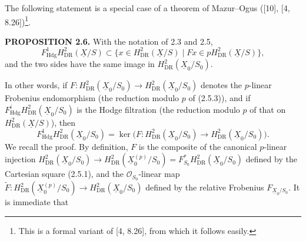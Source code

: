 \documentclass[10pt]{article}
\newcommand{\UX}{\underline{X}}
\begin{document}
The following statement is a special case of a theorem of Mazur--Ogus ([10], [4, 8.26])\footnote{This is a formal variant of [4, 8.26], from which it follows easily.}.

\noindent\textbf{PROPOSITION 2.6.} With the notation of 2.3 and 2.5,
\[
F^1_{\mathrm{Hdg}}H^2_{\mathrm{DR}}(\UX/S)
\subset\{x\in H^2_{\mathrm{DR}}(\UX/S)\mid Fx\in pH^2_{\mathrm{DR}}(\UX/S)\},
\]
and the two sides have the same image in $H^2_{\mathrm{DR}}(\UX_0/S_0)$.

In other words, if $F:H^2_{\mathrm{DR}}(\UX_0/S_0)\to H^2_{\mathrm{DR}}(\UX_0/S_0)$ denotes the $p$-linear Frobenius endomorphism (the reduction modulo $p$ of (2.5.3)), and if $F^i_{\mathrm{Hdg}}H^2_{\mathrm{DR}}(\UX_0/S_0)$ is the Hodge filtration (the reduction modulo $p$ of that on $H^2_{\mathrm{DR}}(\UX/S)$), then
\begin{equation}\tag{2.6.1}
F^1_{\mathrm{Hdg}}H^2_{\mathrm{DR}}(\UX_0/S_0)
=\ker\bigl(F:H^2_{\mathrm{DR}}(\UX_0/S_0)\to H^2_{\mathrm{DR}}(\UX_0/S_0)\bigr).
\end{equation}
We recall the proof. By definition, $F$ is the composite of the canonical $p$-linear injection
$H^2_{\mathrm{DR}}(\UX_0/S_0)\to H^2_{\mathrm{DR}}(\UX_0^{(p)}/S_0)=F_{S_0}^*H^2_{\mathrm{DR}}(\UX_0/S_0)$ defined by the Cartesian square (2.5.1), and the $\mathcal O_{S_0}$-linear map
$\widetilde F:H^2_{\mathrm{DR}}(\UX_0^{(p)}/S_0)\to H^2_{\mathrm{DR}}(\UX_0/S_0)$ defined by the relative Frobenius $F_{\UX_0/S_0}$. It is immediate that
\newpage
\setcounter{footnote}{0}
\fontsize{10.2pt}{12.04pt}\selectfont
\end{document}
